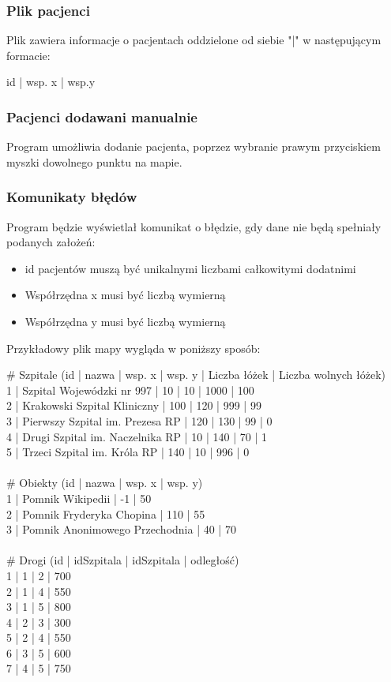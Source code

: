 \documentclass{article}
\begin{document}
\subsubsection{Plik pacjenci}
Plik zawiera informacje o pacjentach oddzielone od siebie "|"  w następującym formacie:

id | wsp. x | wsp.y 

\subsubsection{Pacjenci dodawani manualnie}
Program umożliwia dodanie pacjenta, poprzez wybranie prawym przyciskiem myszki dowolnego punktu na mapie.

\subsubsection{Komunikaty błędów}
Program będzie wyświetlał komunikat o błędzie, gdy dane nie będą spełniały podanych założeń:

\begin{itemize}
\item id pacjentów muszą być unikalnymi liczbami całkowitymi dodatnimi
\item Współrzędna x musi być liczbą wymierną
\item Współrzędna y musi być liczbą wymierną
\end{itemize}



Przykładowy plik mapy wygląda w poniższy sposób:

 \vspace{0.8cm}

\# Szpitale (id | nazwa | wsp. x | wsp. y | Liczba łóżek | Liczba wolnych łóżek)\\
1 | Szpital Wojewódzki nr 997 | 10 | 10 | 1000 | 100\\
2 | Krakowski Szpital Kliniczny | 100 | 120 | 999 | 99\\
3 | Pierwszy Szpital im. Prezesa RP | 120 | 130 | 99 | 0\\
4 | Drugi Szpital im. Naczelnika RP | 10 | 140 | 70 | 1\\
5 | Trzeci Szpital im. Króla RP | 140 | 10 | 996 | 0\\
\\
\# Obiekty (id | nazwa | wsp. x | wsp. y)\\
1 | Pomnik Wikipedii | -1 | 50\\
2 | Pomnik Fryderyka Chopina | 110 | 55\\
3 | Pomnik Anonimowego Przechodnia | 40 | 70\\
\\
\# Drogi (id | idSzpitala | idSzpitala | odległość)\\
1 | 1 | 2 | 700\\
2 | 1 | 4 | 550\\
3 | 1 | 5 | 800\\
4 | 2 | 3 | 300\\
5 | 2 | 4 | 550\\
6 | 3 | 5 | 600\\
7 | 4 | 5 | 750\\
\end{document}
